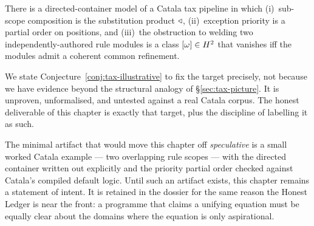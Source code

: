 \begin{conjecture}\label{conj:tax-illustrative}
There is a directed-container model of a Catala tax pipeline in which
(i)~sub-scope composition is the substitution product $\triangleleft$, (ii)~exception
priority is a partial order on positions, and (iii)~the obstruction to welding
two independently-authored rule modules is a class $[\omega]\in H^2$ that
vanishes iff the modules admit a coherent common refinement.
\end{conjecture}

We state Conjecture~\ref{conj:tax-illustrative} to fix the target precisely, not
because we have evidence beyond the structural analogy of \S\ref{sec:tax-picture}.
It is unproven, unformalised, and untested against a real Catala corpus. The
honest deliverable of this chapter is exactly that target, plus the discipline of
labelling it as such.

\begin{remark}\label{rem:tax-next}
The minimal artifact that would move this chapter off \emph{speculative} is a
small worked Catala example --- two overlapping rule scopes --- with the directed
container written out explicitly and the priority partial order checked against
Catala's compiled default logic. Until such an artifact exists, this chapter
remains a statement of intent. It is retained in the dossier for the same reason
the Honest Ledger is near the front: a programme that claims a unifying equation
must be equally clear about the domains where the equation is only aspirational.
\end{remark}

